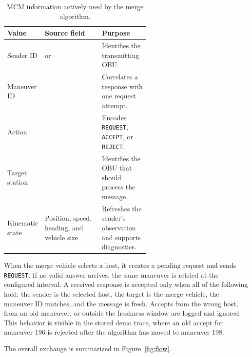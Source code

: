 \documentclass[a4paper,12pt]{article}
\begin{document}
\begin{table}[H]
\centering
\footnotesize
\caption{MCM information actively used by the merge algorithm.}
\label{tab:mcm_fields}
\begin{tabularx}{\linewidth}{L{0.18\linewidth} L{0.40\linewidth} Y}
\toprule
\textbf{Value} & \textbf{Source field} & \textbf{Purpose} \\
\midrule
Sender ID &  or  & Identifies the transmitting OBU. \\
Maneuver ID &  & Correlates a response with one request attempt. \\
Action &  & Encodes \texttt{REQUEST}, \texttt{ACCEPT}, or \texttt{REJECT}. \\
Target station &  & Identifies the OBU that should process the message. \\
Kinematic state & Position, speed, heading, and vehicle size & Refreshes the sender's observation and supports diagnostics. \\
\bottomrule
\end{tabularx}
\end{table}

When the merge vehicle selects a host, it creates a pending request and sends \texttt{REQUEST}. If no valid answer arrives, the same maneuver is retried at the configured interval. A received response is accepted only when all of the following hold: the sender is the selected host, the target is the merge vehicle, the maneuver ID matches, and the message is fresh. Accepts from the wrong host, from an old maneuver, or outside the freshness window are logged and ignored. This behavior is visible in the stored demo trace, where an old accept for maneuver 196 is rejected after the algorithm has moved to maneuver 198.

The overall exchange is summarized in Figure~\ref{fig:flow}.
\end{document}

